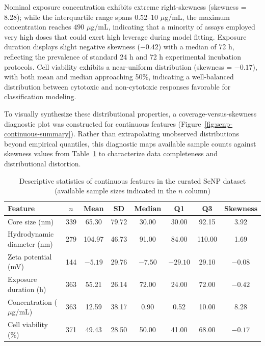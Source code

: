 \documentclass[letterpaper]{article}
\begin{document}
Nominal exposure concentration exhibits extreme right-skewness (skewness = 8.28); while the interquartile range spans $0.52$--$10$ $\mu$g/mL, the maximum concentration reaches $490$ $\mu$g/mL, indicating that a minority of assays employed very high doses that could exert high leverage during model fitting. Exposure duration displays slight negative skewness ($-0.42$) with a median of 72 h, reflecting the prevalence of standard 24 h and 72 h experimental incubation protocols. Cell viability exhibits a near-uniform distribution (skewness = $-0.17$), with both mean and median approaching 50\%, indicating a well-balanced distribution between cytotoxic and non-cytotoxic responses favorable for classification modeling.

To visually synthesize these distributional properties, a coverage-versus-skewness diagnostic plot was constructed for continuous features (Figure~\ref{fig:senp-continuous-summary}). Rather than extrapolating unobserved distributions beyond empirical quantiles, this diagnostic maps available sample counts against skewness values from Table~\ref{tab:senp_feature_statistics} to characterize data completeness and distributional distortion.

\begin{table}[H]
  \centering
  \caption{Descriptive statistics of continuous features in the curated SeNP dataset (available sample sizes indicated in the $n$ column)}
  \label{tab:senp_feature_statistics}
  \begin{tabular}{lccccccc}
    \hline
    Feature & $n$ & Mean & SD & Median & Q1 & Q3 & Skewness \\
    \hline
    Core size (nm)               & 339 & 65.30  & 79.72  & 30.00  & 30.00  & 92.15   & 3.92  \\
    Hydrodynamic diameter (nm)   & 279 & 104.97 & 46.73  & 91.00  & 84.00  & 110.00  & 1.69  \\
    Zeta potential (mV)          & 144 & $-5.19$ & 29.76  & $-7.50$ & $-29.10$ & 29.10 & $-0.08$ \\
    Exposure duration (h)        & 363 & 55.21  & 26.14  & 72.00  & 24.00  & 72.00   & $-0.42$ \\
    Concentration ($\mu$g/mL)    & 363 & 12.59  & 38.17  & 0.90   & 0.52   & 10.00   & 8.28  \\
    Cell viability (\%)          & 371 & 49.43  & 28.50  & 50.00  & 41.00  & 68.00   & $-0.17$ \\
    \hline
  \end{tabular}
\end{table}
\end{document}
